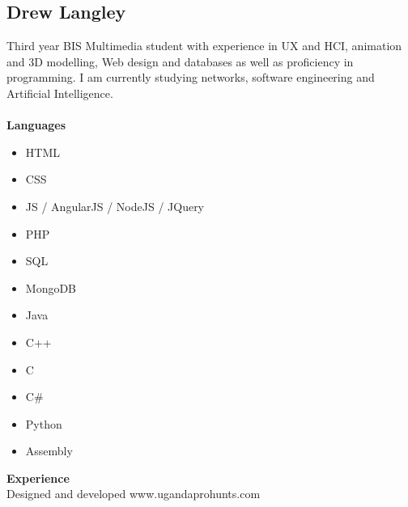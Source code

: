 \documentclass{article}
\begin{document}
\subsection {Drew Langley}
Third year BIS Multimedia student with experience in UX and HCI, animation and 3D modelling, Web design and databases as well as proficiency in programming. I am currently studying networks, software engineering and Artificial Intelligence. \\ \\
\textbf{Languages}
\begin{itemize}
	\item HTML
	\item CSS 
	\item JS / AngularJS / NodeJS / JQuery 
	\item PHP 
	\item SQL
	\item MongoDB
	\item Java 
	\item C++ 
	\item C 
	\item C\# 
	\item Python 
	\item Assembly
\end{itemize}
\textbf{Experience} \\
Designed and developed www.ugandaprohunts.com
\end{document}
